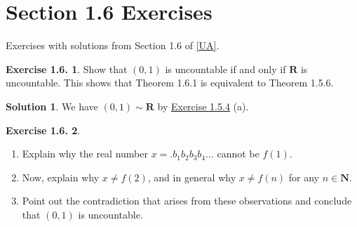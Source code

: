 \documentclass[12pt]{article}
\theoremstyle{definition}
\theoremstyle{exercise}
\newtheorem{exercise}{Exercise 1.6.}
\theoremstyle{solution}
\newtheorem*{solution}{Solution}
\newcommand{\N}{\mathbf{N}}
\newcommand{\R}{\mathbf{R}}
\begin{document}
\section{Section 1.6 Exercises}

Exercises with solutions from Section 1.6 of \hyperlink{ua}{[UA]}.

\begin{exercise}
\label{ex:1}
    Show that \( (0, 1) \) is uncountable if and only if \( \R \) is uncountable. This shows that Theorem 1.6.1 is equivalent to Theorem 1.5.6.
\end{exercise}

\begin{solution}
    We have \( (0, 1) \sim \R \) by \href{https://lew98.github.io/Mathematics/UA_Section_1_5_Exercises.pdf}{Exercise 1.5.4} (a).
\end{solution}

\begin{exercise}
\label{ex:2}
    \begin{enumerate}
        \item Explain why the real number \( x = .b_1 b_2 b_3 b_4 \ldots \) cannot be \( f(1) \).

        \item Now, explain why \( x \neq f(2) \), and in general why \( x \neq f(n) \) for any \( n \in \N \).

        \item Point out the contradiction that arises from these observations and conclude that \( (0, 1) \) is uncountable.
    \end{enumerate}
\end{exercise}
\end{document}
